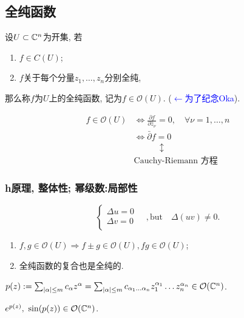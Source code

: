 \subsection{全纯函数}
\begin{definition}
  设$U \subset {\mathbb C}^n $为开集, 若
  \begin{enumerate}[1)]
    \item $f \in C(U)$;
    \item $f$关于每个分量$z_1,\dots,z_n $分别全纯,
  \end{enumerate}
  那么称$f$为$U$上的全纯函数, 记为$f \in \mathcal{O}(U)$. (\textcolor{blue}{$\leftarrow$为了纪念Oka}).
\end{definition}
\begin{remark}
    \begin{align*}
      f \in \mathcal{O}(U) &\iff  \frac{\partial f}{\partial \bar z_\nu } =0, \quad \forall \nu =1,\dots,n\\
      &\iff  \bar{\partial}f=0\\
      & \qquad \quad \updownarrow \\
      & \text{Cauchy-Riemann 方程}
    \end{align*} 
\end{remark}
\subsubsection{h原理, 整体性; 幂级数:局部性}
\begin{example}
  \begin{equation*}
    \left\{ 
    \begin{aligned}
      \Delta u=0\\
     \Delta v=0 \\
    \end{aligned} \quad, 
    \right.
    \text{but} \quad \Delta (uv)\neq 0.
  \end{equation*}
\end{example}
\begin{property}
    \begin{enumerate}
      \item $f,g \in \mathcal{O}(U) \Rightarrow f \pm g \in \mathcal{O}(U), fg \in \mathcal{O}(U)$;
      \item 全纯函数的复合也是全纯的.
    \end{enumerate}
\end{property}
\begin{example}
  $p(z):=\sum_{|\alpha |\leq m}^{}c_\alpha z^\alpha=\sum_{|\alpha |\leq m}^{}c_{\alpha_1 \dots \alpha _n} z_1^{\alpha_1 } \dots z_n^{\alpha _n} \in \mathcal{O}({\mathbb C}^n)$.

  $e^{p(z)},~\sin (p(z)) \in \mathcal{O}({\mathbb C}^n)$.
\end{example}

